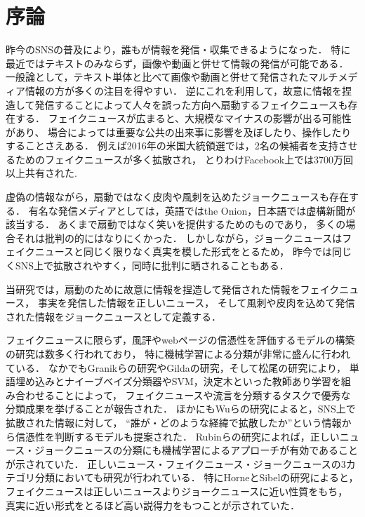 \section{序論}\label{ch:introduction}
%
昨今のSNSの普及により，誰もが情報を発信・収集できるようになった．
特に最近ではテキストのみならず，画像や動画と併せて情報の発信が可能である．
一般論として，テキスト単体と比べて画像や動画と併せて発信されたマルチメディア情報の方が多くの注目を得やすい．
逆にこれを利用して，故意に情報を捏造して発信することによって人々を誤った方向へ扇動するフェイクニュースも存在する．
フェイクニュースが広まると、大規模なマイナスの影響が出る可能性があり、
場合によっては重要な公共の出来事に影響を及ぼしたり、操作したりすることさえある．
例えば2016年の米国大統領選では，2名の候補者を支持させるためのフェイクニュースが多く拡散され，
とりわけFacebook上では3700万回以上共有された\cite{10.1257/jep.31.2.211}.

虚偽の情報ながら，扇動ではなく皮肉や風刺を込めたジョークニュースも存在する．
有名な発信メディアとしては，英語ではthe Onion，日本語では虚構新聞が該当する．
あくまで扇動ではなく笑いを提供するためのものであり，
多くの場合それは批判の的にはなりにくかった．
しかしながら，ジョークニュースはフェイクニュースと同じく限りなく真実を模した形式をとるため，
昨今では同じくSNS上で拡散されやすく，同時に批判に晒されることもある．

当研究では，扇動のために故意に情報を捏造して発信された情報をフェイクニュース，
事実を発信した情報を正しいニュース，
そして風刺や皮肉を込めて発信された情報をジョークニュースとして定義する．

フェイクニュースに限らず，風評やwebページの信憑性を評価するモデルの構築の研究は数多く行われており，
特に機械学習による分類が非常に盛んに行われている．
なかでもGranikらの研究\cite{Granik8100379}やGildaの研究\cite{Gilda8305411}，そして松尾の研究\cite{松尾省吾2018master}により，
単語埋め込みとナイーブベイズ分類器やSVM，決定木といった教師あり学習を組み合わせることによって，
フェイクニュースや流言を分類するタスクで優秀な分類成果を挙げることが報告された．
ほかにもWuらの研究\cite{Wu:2018:TFF:3159652.3159677}によると，SNS上で拡散された情報に対して，
``誰が・どのような経緯で拡散したか''という情報から信憑性を判断するモデルも提案された． 
Rubinらの研究\cite{W16-0802}によれば，正しいニュース・ジョークニュースの分類にも機械学習によるアプローチが有効であることが示されていた．
正しいニュース・フェイクニュース・ジョークニュースの3カテゴリ分類においても研究が行われている．
特にHorneとSibelの研究\cite{DBLP:journals/corr/HorneA17}によると，フェイクニュースは正しいニュースよりジョークニュースに近い性質をもち，
真実に近い形式をとるほど高い説得力をもつことが示されていた．

